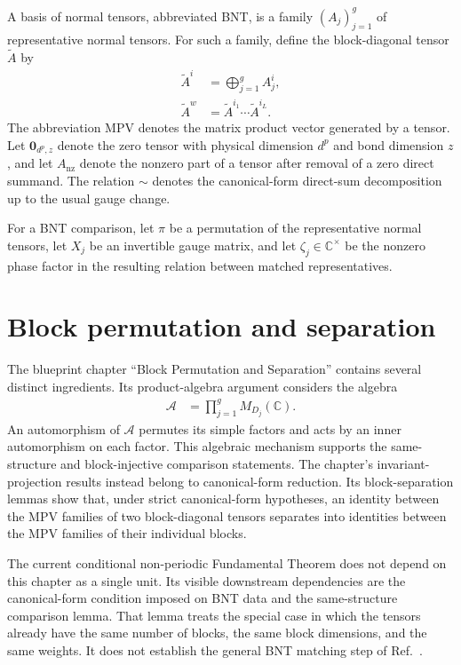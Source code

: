 \documentclass{article}
\begin{document}
A basis of normal tensors, abbreviated BNT, is a family
$(A_j)_{j=1}^g$ of representative normal tensors. For such a family, define
the block-diagonal tensor $\tilde A$ by
\begin{align}
    \tilde A^i
        &= \bigoplus_{j=1}^g A_j^i,
    \label{eq:tnlean_ft_dependency_audit_bnt_direct_sum}\\
    \tilde A^w
        &= \tilde A^{i_1}\cdots\tilde A^{i_L}.
    \label{eq:tnlean_ft_dependency_audit_bnt_word_product}
\end{align}
The abbreviation MPV denotes the matrix product vector generated by a tensor.
Let $\mathbf{0}_{d^p,z}$ denote the zero tensor with physical dimension $d^p$
and bond dimension $z$, and let $A_{\mathrm{nz}}$ denote the nonzero part of a
tensor after removal of a zero direct summand. The relation $\sim$ denotes the
canonical-form direct-sum decomposition up to the usual gauge change.

For a BNT comparison, let $\pi$ be a permutation of the representative normal
tensors, let $X_j$ be an invertible gauge matrix, and let
$\zeta_j\in\mathbb{C}^{\times}$ be the nonzero phase factor in the resulting
relation between matched representatives.

\section{Block permutation and separation}

The blueprint chapter ``Block Permutation and Separation'' contains several
distinct ingredients. Its product-algebra argument considers the algebra
\begin{align}
    \mathcal A
        &= \prod_{j=1}^g M_{D_j}(\mathbb{C}).
    \label{eq:tnlean_ft_dependency_audit_product_algebra}
\end{align}
An automorphism of $\mathcal A$ permutes its simple factors and acts by an inner
automorphism on each factor. This algebraic mechanism supports the
same-structure and block-injective comparison statements. The chapter's
invariant-projection results instead belong to canonical-form reduction. Its
block-separation lemmas show that, under strict canonical-form hypotheses, an
identity between the MPV families of two block-diagonal tensors separates into
identities between the MPV families of their individual blocks.

The current conditional non-periodic Fundamental Theorem does not depend on
this chapter as a single unit. Its visible downstream dependencies are the
canonical-form condition imposed on BNT data and the same-structure comparison
lemma. That lemma treats the special case in which the tensors already have
the same number of blocks, the same block dimensions, and the same weights. It
does not establish the general BNT matching step of
Ref.~\cite{Cirac2016MPDO_arXiv}.
\end{document}
